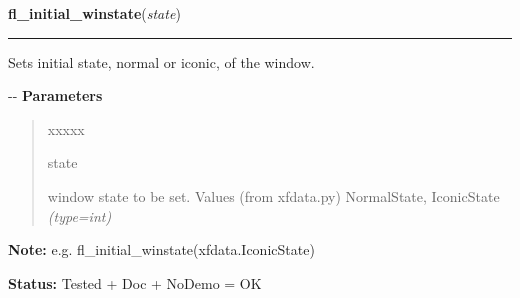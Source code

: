 \hspace{.8\funcindent}\begin{boxedminipage}{\funcwidth}

    \raggedright \textbf{fl\_initial\_winstate}(\textit{state})

    \vspace{-1.5ex}

    \rule{\textwidth}{0.5\fboxrule}
\setlength{\parskip}{2ex}

Sets initial state, normal or iconic, of the window.

-{}-
\setlength{\parskip}{1ex}
      \textbf{Parameters}
      \vspace{-1ex}

      \begin{quote}
        \begin{Ventry}{xxxxx}

          \item[state]


window state to be set. Values (from xfdata.py) NormalState,
IconicState
            {\it (type=int)}

        \end{Ventry}

      \end{quote}

\textbf{Note:} 
e.g. fl\_initial\_winstate(xfdata.IconicState)


\textbf{Status:} 
Tested + Doc + NoDemo = OK


    \end{boxedminipage}

    \label{xformslib:flxbasic:fl_create_colormap}

    \vspace{0.5ex}

